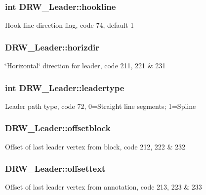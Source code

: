 \subsubsection[{hookline}]{\setlength{\rightskip}{0pt plus 5cm}int D\+R\+W\+\_\+\+Leader\+::hookline}\label{class_d_r_w___leader_a80aca0277cc06cbcb4af9c6a42decf06}
Hook line direction flag, code 74, default 1 \hypertarget{class_d_r_w___leader_a31292925946b20b3c24f679c54f83523}{}
\subsubsection[{horizdir}]{ D\+R\+W\+\_\+\+Leader\+::horizdir}\label{class_d_r_w___leader_a31292925946b20b3c24f679c54f83523}
\char`\"{}\+Horizontal\char`\"{} direction for leader, code 211, 221 \& 231 \hypertarget{class_d_r_w___leader_a4ba900b63165cb87b79612a9f9b4ff50}{}
\subsubsection[{leadertype}]{\setlength{\rightskip}{0pt plus 5cm}int D\+R\+W\+\_\+\+Leader\+::leadertype}\label{class_d_r_w___leader_a4ba900b63165cb87b79612a9f9b4ff50}
Leader path type, code 72, 0=Straight line segments; 1=Spline \hypertarget{class_d_r_w___leader_aa6a2e2b354365f405b52240c9bca3c8a}{}
\subsubsection[{offsetblock}]{ D\+R\+W\+\_\+\+Leader\+::offsetblock}\label{class_d_r_w___leader_aa6a2e2b354365f405b52240c9bca3c8a}
Offset of last leader vertex from block, code 212, 222 \& 232 \hypertarget{class_d_r_w___leader_a6326c764bc74feaf7a5a3efa57325f67}{}
\subsubsection[{offsettext}]{ D\+R\+W\+\_\+\+Leader\+::offsettext}\label{class_d_r_w___leader_a6326c764bc74feaf7a5a3efa57325f67}
Offset of last leader vertex from annotation, code 213, 223 \& 233 \hypertarget{class_d_r_w___leader_a7a4e898ceae92208a03e86f7857e78e0}{}
